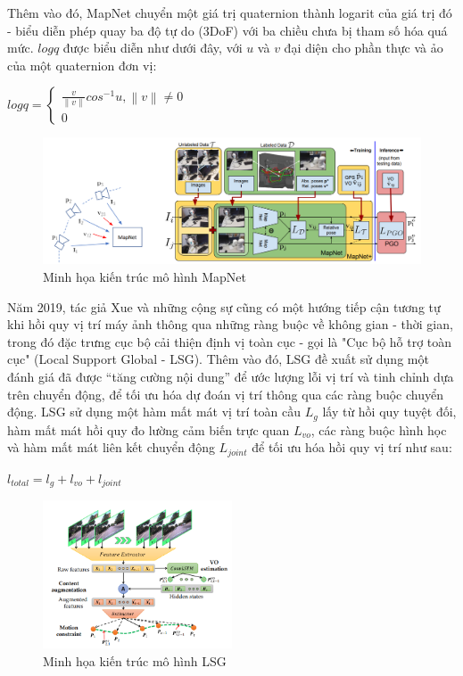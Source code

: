 Thêm vào đó, MapNet chuyển một giá trị quaternion thành logarit của giá trị đó - biểu diễn phép quay ba độ tự do (3DoF) với ba chiều chưa bị tham số hóa quá mức. $logq$ được biểu diễn như dưới đây, với $u$ và $v$ đại diện cho phần thực và ảo của một quaternion đơn vị:
\begin{center}
    $logq = 
    \begin{cases}
      \frac{v}{\left \| v \right \|}cos^{-1}u, \left \| v \right \| \neq 0\\    
      0   
    \end{cases}$
\end{center}
\begin{figure}[H]
    \centering
    \includegraphics[width=\textwidth]{pics/Chapter2/mapnet.png}
    \caption{Minh họa kiến trúc mô hình MapNet \cite{brahmbhatt2018geometryaware}}
\end{figure}
Năm 2019, tác giả Xue và những cộng sự \cite{xue2019local} cũng có một hướng tiếp cận tương tự khi hồi quy vị trí máy ảnh thông qua những ràng buộc về không gian - thời gian, trong đó đặc trưng cục bộ cải thiện định vị toàn cục - gọi là "Cục bộ hỗ trợ toàn cục" (Local Support Global - LSG). Thêm vào đó, LSG đề xuất sử dụng một đánh giá đã được “tăng cường nội dung” để ước lượng lỗi vị trí và tinh chỉnh dựa trên chuyển động, để tối ưu hóa dự đoán vị trí thông qua các ràng buộc chuyển động. LSG sử dụng một hàm mất mát vị trí toàn cầu $L_g$ lấy từ hồi quy tuyệt đối, hàm mất mát hồi quy đo lường cảm biến trực quan $L_{vo}$, các ràng buộc hình học và hàm mất mát liên kết chuyển động $L_{joint}$ để tối ưu hóa hồi quy vị trí như sau:
\begin{center}
$l_{total} = l_g + l_{vo} + l_{joint}$
\end{center}
\begin{figure}[H]
    \centering
    \includegraphics[width=0.5\textwidth]{pics/Chapter2/lsg.png}
    \caption{Minh họa kiến trúc mô hình LSG \cite{xue2019local}}
\end{figure}
